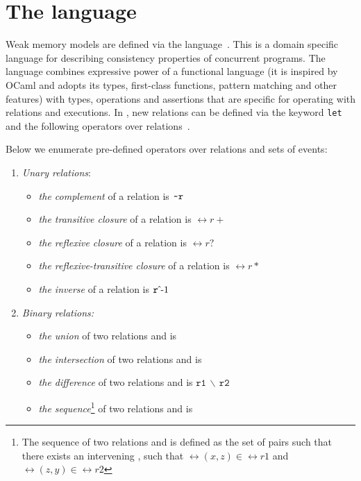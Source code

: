 \section{The \cat{} language}
\label{ch:wmm:cat}

Weak memory models are defined via the \cat{} language~\cite{alglave2016syntax}.
This is a domain specific language for describing consistency properties of concurrent programs.
The \cat{} language combines expressive power of a functional language (it is inspired by OCaml and adopts its types, first-class functions, pattern matching and other features) with types, operations and assertions that are specific for operating with relations and executions.
In \cat{}, new relations can be defined via the keyword \texttt{let} and the following operators over relations~\cite{alglave2016syntax}. %


Below we enumerate pre-defined operators over relations and sets of events:

\begin{enumerate}
  \item \textit{Unary relations}:
    \begin{itemize}
      \item \textit{the complement} of a relation  is $\texttt{\textasciitilde r}$
      \item \textit{the transitive closure} of a relation  is $\rel{r+}$
      \item \textit{the reflexive closure} of a relation  is $\rel{r?}$
      \item \textit{the reflexive-transitive closure} of a relation  is $\rel{r*}$
      \item \textit{the inverse} of a relation  is $\invrel{r}$
    \end{itemize}
  \item \textit{Binary relations:}
  \begin{itemize}
    \item \textit{the union} of two relations  and  is 
    \item \textit{the intersection} of two relations  and  is 
    \item \textit{the difference} of two relations  and  is $\mathtt{r1\,\backslash\,r2}$
    \item \textit{the sequence}\footnote{The sequence of two relations  and  is defined as the set of pairs  such that there exists an intervening , such that $\rel{(x,z)} \in \rel{r1}$ and $\rel{(z,y)} \in \rel{r2}$}
    of two relations  and  is 
  \end{itemize}
\end{enumerate}

